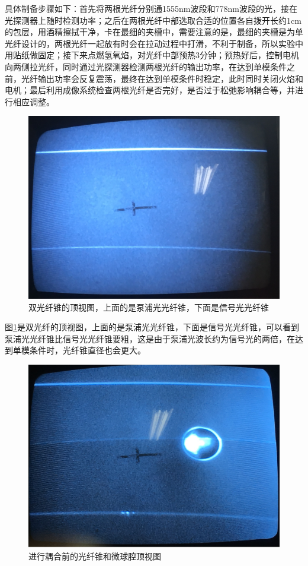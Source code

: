 \documentclass[UTF8,a4paper,cs4size,hyperref]{ctexart}
\begin{document}
具体制备步骤如下：首先将两根光纤分别通1555nm波段和778nm波段的光，接在光探测器上随时检测功率；之后在两根光纤中部选取合适的位置各自拨开长约1cm的包层，用酒精擦拭干净，卡在最细的夹槽中，需要注意的是，最细的夹槽是为单光纤设计的，两根光纤一起放有时会在拉动过程中打滑，不利于制备，所以实验中用贴纸做固定；接下来点燃氢氧焰，对光纤中部预热3分钟；预热好后，控制电机向两侧拉光纤，同时通过光探测器检测两根光纤的输出功率，在达到单模条件之前，光纤输出功率会反复震荡，最终在达到单模条件时稳定，此时同时关闭火焰和电机；最后利用成像系统检查两根光纤是否完好，是否过于松弛影响耦合等，并进行相应调整。

\begin{figure}
\centering
\includegraphics[width=16cm ]{DualFiber}
\caption{双光纤锥的顶视图，上面的是泵浦光光纤锥，下面是信号光光纤锥}
\label{pic:DualFiber}
\end{figure}

图\ref{pic:DualFiber}是双光纤的顶视图，上面的是泵浦光光纤锥，下面是信号光光纤锥，可以看到泵浦光光纤锥比信号光光纤锥要粗，这是由于泵浦光波长约为信号光的两倍，在达到单模条件时，光纤锥直径也会更大。

\begin{figure}
\centering
\includegraphics[width=16cm ]{Fiber_sphere}
\caption{进行耦合前的光纤锥和微球腔顶视图}
\label{pic:Fiber_sphere}
\end{figure}
\end{document}
